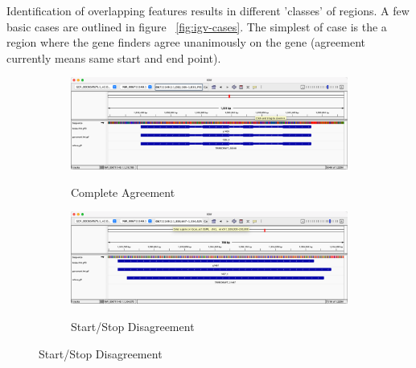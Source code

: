 Identification of overlapping features results in different 'classes'
of regions. A few basic cases are outlined in figure
~\ref{fig:igv-cases}. The simplest of case is the a region where the
gene finders agree unanimously on the gene (agreement currently means
same start and end point). 


\begin{figure}[b]
  \centering
  \begin{subfigure}{0.9\textwidth}
    \includegraphics[width=\textwidth]{figures/igv/igv-agreement-thin.png}
    \label{fig:igv-agree}
    \caption{Complete Agreement}
  \end{subfigure}
  \begin{subfigure}{0.9\textwidth}
    \includegraphics[width=\textwidth]{figures/igv/igv-start-stop-thin.png}
    \label{fig:igv-start-stop}
    \caption{Start/Stop Disagreement}
  \end{subfigure}
\end{figure}

